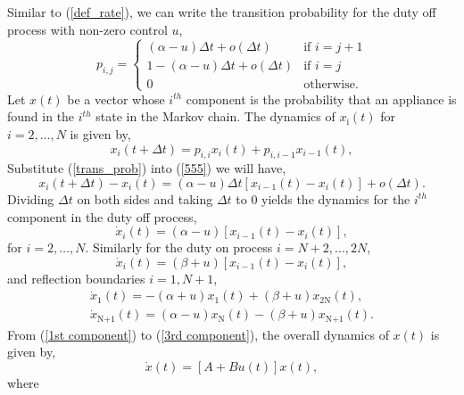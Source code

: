 \documentclass[journal]{IEEEtran}
\begin{document}
Similar to (\ref{def_rate}), we can write the transition probability for the duty off process with non-zero control $u$,
\begin{equation}
\label{trans_prob}
p_{i,j}= \left\{
\begin{array}{ll}
(\alpha-u) \Delta t + o(\Delta t) & \textrm{if $i=j+1$} \\
1-(\alpha-u) \Delta t + o(\Delta t) & \textrm{if $i=j$} \\
0 & \textrm{otherwise}.
\end{array}
\right.
\end{equation}
Let $x(t)$ be a vector whose $i^{th}$ component is the probability that an appliance is found in the $i^{th}$ state in the Markov chain. The dynamics of $x_{\textrm{i}}(t)$ for $i=2,\ldots,N$ is given by,
\begin{equation}
\label{555}
x_{i}(t+\Delta t)=p_{i,i}x_{i}(t)+p_{i,i-1}x_{i-1}(t),
\end{equation}
Substitute (\ref{trans_prob}) into (\ref{555}) we will have,
\begin{equation}
x_{i}(t+\Delta t)-x_{i}(t)=(\alpha-u)\Delta t [x_{i-1}(t)-x_{i}(t)] +o(\Delta t).
\end{equation}
Dividing $\Delta t$ on both sides and taking $\Delta t$ to 0 yields the dynamics for the $i^{th}$ component in the duty off process,
\begin{equation}
\label{1st component}
\dot{x}_{i}(t)=(\alpha-u)[ x_{i-1}(t)-x_{i}(t)], 
\end{equation}
for $i=2,\ldots,N$. Similarly for the duty on process $i=N+2,\ldots,2N$,
\begin{equation}
\label{2nd component}
\dot{x}_{i}(t)=(\beta+u) [x_{i-1}(t)-x_{i}(t)], 
\end{equation}
and reflection boundaries $i=1,N+1$,
\begin{equation}
\label{3rd component}
\begin{array}{ll}
\dot{x}_{1}(t)=-(\alpha+u) x_{1}(t)+(\beta+u) x_{\textrm{2N}}(t), \\
\dot{x}_{\textrm{N+1}}(t)=(\alpha-u) x_{\textrm{N}}(t)-(\beta+u) x_{\textrm{N+1}}(t). 
\end{array}
\end{equation}
From (\ref{1st component}) to (\ref{3rd component}), the overall dynamics of $x(t)$ is given by,
\begin{equation}
\label{main_dyn}
\dot{x}(t)=[A+Bu(t)]x(t),
\end{equation}
where
\end{document}
